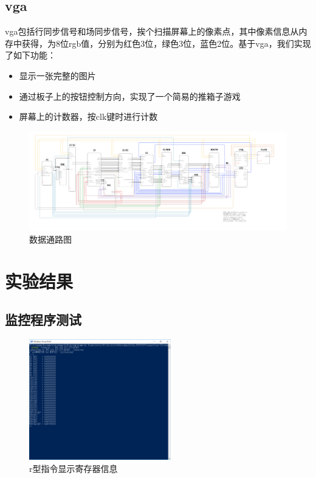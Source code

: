 \documentclass[12pt, utf8, hyperref]{ctexart}
\begin{document}
\subsection{vga}
vga包括行同步信号和场同步信号，挨个扫描屏幕上的像素点，其中像素信息从内存中获得，为8位rgb值，分别为红色3位，绿色3位，蓝色2位。基于vga，我们实现了如下功能：
\begin{itemize}
    \item 显示一张完整的图片
    \item 通过板子上的按钮控制方向，实现了一个简易的推箱子游戏
    \item 屏幕上的计数器，按clk键时进行计数
\end{itemize}
\begin{figure}[H]
    \centering
    \includegraphics[width=1.5\textwidth, angle=270]{screenshots/datapath.png}
    \caption{数据通路图}
\end{figure}
\newpage

\section{实验结果}
\subsection{监控程序测试}

\begin{figure}[H]
    \centering
    \includegraphics[width=0.55\textwidth]{screenshots/r.png}
    \caption{r型指令显示寄存器信息}
\end{figure}
\end{document}
